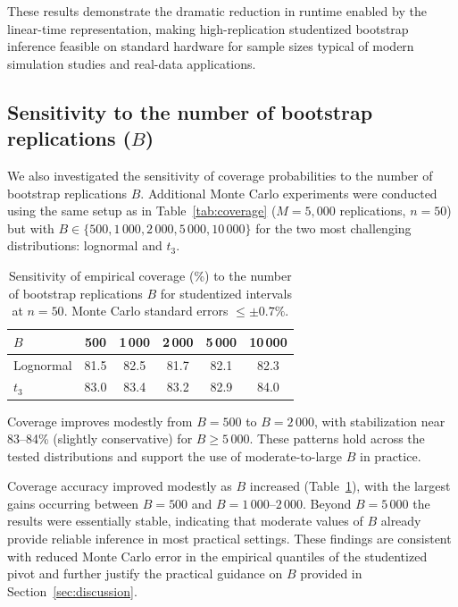 \documentclass[12pt,a4paper]{article}
\begin{document}
These results demonstrate the dramatic reduction in runtime enabled by the linear-time representation, making high-replication studentized bootstrap inference feasible on standard hardware for sample sizes typical of modern simulation studies and real-data applications.


\subsection{Sensitivity to the number of bootstrap replications ($B$)}

We also investigated the sensitivity of coverage probabilities to the number of bootstrap replications $B$. Additional Monte Carlo experiments were conducted using the same setup as in Table~\ref{tab:coverage} ($M=5{,}000$ replications, $n=50$) but with $B \in \{500, 1\,000, 2\,000, 5\,000, 10\,000\}$ for the two most challenging distributions: lognormal and $t_3$.

\begin{table}[htbp]
\centering
\caption{Sensitivity of empirical coverage (\%) to the number of bootstrap replications $B$ for studentized intervals at $n=50$. Monte Carlo standard errors $\le \pm 0.7\%$.}
\label{tab:sensitivity-B}
\begin{threeparttable}
\begin{tabular}{lccccc}
\toprule
$B$       & 500    & 1\,000 & 2\,000 & 5\,000 & 10\,000 \\
\midrule
Lognormal & 81.5   & 82.5   & 81.7   & 82.1   & 82.3   \\
$t_3$     & 83.0   & 83.4   & 83.2   & 82.9   & 84.0   \\
\bottomrule
\end{tabular}
\begin{tablenotes}
\small
\item Coverage improves modestly from $B=500$ to $B=2\,000$, with stabilization near 83--84\% (slightly conservative) for $B \ge 5\,000$. These patterns hold across the tested distributions and support the use of moderate-to-large $B$ in practice.
\end{tablenotes}
\end{threeparttable}
\end{table}

Coverage accuracy improved modestly as $B$ increased (Table~\ref{tab:sensitivity-B}), with the largest gains occurring between $B=500$ and $B=1\,000$--$2\,000$. Beyond $B=5\,000$ the results were essentially stable, indicating that moderate values of $B$ already provide reliable inference in most practical settings. These findings are consistent with reduced Monte Carlo error in the empirical quantiles of the studentized pivot and further justify the practical guidance on $B$ provided in Section~\ref{sec:discussion}.
\end{document}
